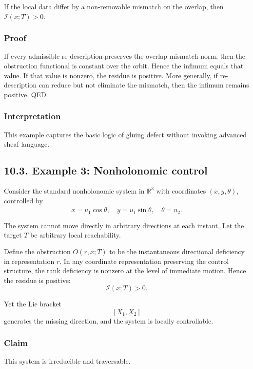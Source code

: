 \documentclass[
]{article}
\begin{document}
If the local data differ by a non-removable mismatch on the overlap,
then \(\mathcal{I}(x;T) > 0\).

\subsubsection{Proof}\label{proof-8}

If every admissible re-description preserves the overlap mismatch norm,
then the obstruction functional is constant over the orbit. Hence the
infimum equals that value. If that value is nonzero, the residue is
positive. More generally, if re-description can reduce but not eliminate
the mismatch, then the infimum remains positive. QED.

\subsubsection{Interpretation}\label{interpretation-4}

This example captures the basic logic of gluing defect without invoking
advanced sheaf language.

\subsection{10.3. Example 3: Nonholonomic
control}\label{example-3-nonholonomic-control}

Consider the standard nonholonomic system in \(\mathbb{R}^3\) with
coordinates \((x,y,\theta)\), controlled by \[
\dot{x} = u_1 \cos\theta,\quad
\dot{y} = u_1 \sin\theta,\quad
\dot{\theta} = u_2.
\]

The system cannot move directly in arbitrary directions at each instant.
Let the target \(T\) be arbitrary local reachability.

Define the obstruction \(O(r,x;T)\) to be the instantaneous directional
deficiency in representation \(r\). In any coordinate representation
preserving the control structure, the rank deficiency is nonzero at the
level of immediate motion. Hence the residue is positive: \[
\mathcal{I}(x;T) > 0.
\]

Yet the Lie bracket \[
[X_1,X_2]
\] generates the missing direction, and the system is locally
controllable.

\subsubsection{Claim}\label{claim-2}

This system is irreducible and traversable.
\end{document}
